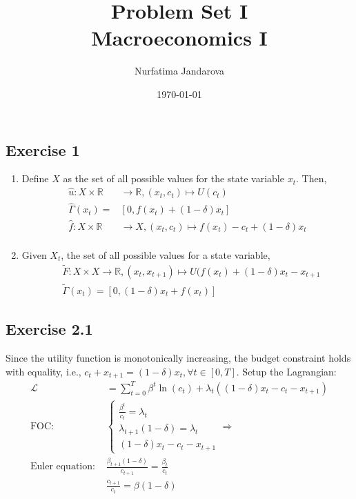 \documentclass[]{article}
\title{Problem Set I \\ \large Macroeconomics I}
\author{Nurfatima Jandarova}
\date{\today}
\begin{document}
\maketitle

\subsection*{Exercise 1}

\begin{enumerate}[label=(\roman*)]
	\item Define $X$ as the set of all possible values for the state variable $x_t$. Then, 
	\begin{equation}
		\begin{split}
		\hat{u}: X\times\mathbb{R} &\longrightarrow \mathbb{R}, (x_t, c_t) \longmapsto U(c_t) \\ \nonumber
		\hat{\Gamma}(x_t) = &[0, f(x_t)+(1-\delta)x_t] \\
		\hat{f}: X\times\mathbb{R} &\longrightarrow X, (x_t, c_t) \longmapsto f(x_t)-c_t+(1-\delta)x_t\\
		\end{split}
	\end{equation}
	
	\item Given $X_t$, the set of all possible values for a state variable,
	\begin{equation}
		\begin{split}
		&\tilde{F}: X\times X\longrightarrow\mathbb{R}, (x_t, x_{t+1}) \longmapsto U(f(x_t)+(1-\delta)x_t-x_{t+1} \\ \nonumber
		&\tilde{\Gamma}(x_t) = [0, (1-\delta)x_t+f(x_t)]
		\end{split}
	\end{equation}
\end{enumerate}

\subsection*{Exercise 2.1}
Since the utility function is monotonically increasing, the budget constraint holds with equality, i.e.,  $c_t+x_{t+1}=(1-\delta)x_t, \forall t \in [0, T]$. Setup the Lagrangian:
\begin{equation}
	\begin{split}
	\mathcal{L}& = \sum\limits_{t=0}^{T}\beta^t\ln(c_t)+\lambda_t((1-\delta)x_t-c_t-x_{t+1})\\\nonumber
	\text{FOC: }& \begin{cases}
	\frac{\beta^t}{c_t}=\lambda_t \\
	\lambda_{t+1}(1-\delta) = \lambda_t \\
	(1-\delta)x_t-c_t-x_{t+1}
	\end{cases}\Rightarrow\\
	\text{Euler equation: }& \frac{\beta_{t+1}(1-\delta)}{c_{t+1}}=\frac{\beta_{t}}{c_{t}} \\
	& \frac{c_{t+1}}{c_t}=\beta(1-\delta)
	\end{split}
\end{equation}
\end{document}
